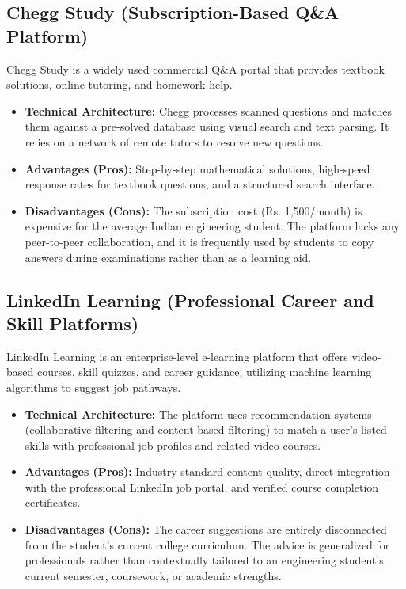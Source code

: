 \documentclass[12,Times new Roman,a4paper]{report}
\newcommand{\rupee}{Rs. }
\begin{document}
\subsection{Chegg Study (Subscription-Based Q\&A Platform)}
Chegg Study is a widely used commercial Q\&A portal that provides textbook solutions, online tutoring, and homework help.
\begin{itemize}
    \item \textbf{Technical Architecture:} Chegg processes scanned questions and matches them against a pre-solved database using visual search and text parsing. It relies on a network of remote tutors to resolve new questions.
    \item \textbf{Advantages (Pros):} Step-by-step mathematical solutions, high-speed response rates for textbook questions, and a structured search interface.
    \item \textbf{Disadvantages (Cons):} The subscription cost (\rupee1,500/month) is expensive for the average Indian engineering student. The platform lacks any peer-to-peer collaboration, and it is frequently used by students to copy answers during examinations rather than as a learning aid.
\end{itemize}

\subsection{LinkedIn Learning (Professional Career and Skill Platforms)}
LinkedIn Learning is an enterprise-level e-learning platform that offers video-based courses, skill quizzes, and career guidance, utilizing machine learning algorithms to suggest job pathways.
\begin{itemize}
    \item \textbf{Technical Architecture:} The platform uses recommendation systems (collaborative filtering and content-based filtering) to match a user's listed skills with professional job profiles and related video courses.
    \item \textbf{Advantages (Pros):} Industry-standard content quality, direct integration with the professional LinkedIn job portal, and verified course completion certificates.
    \item \textbf{Disadvantages (Cons):} The career suggestions are entirely disconnected from the student's current college curriculum. The advice is generalized for professionals rather than contextually tailored to an engineering student's current semester, coursework, or academic strengths.
\end{itemize}
\end{document}
